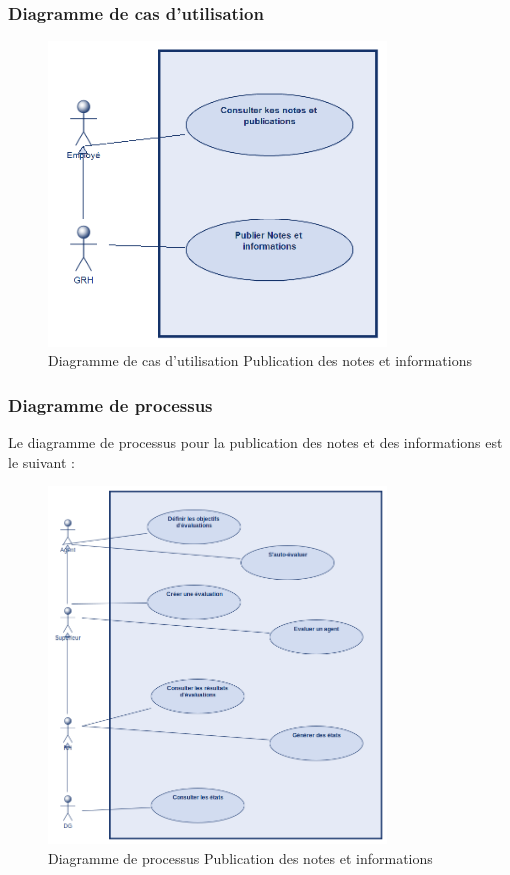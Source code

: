 \subsubsection{Diagramme de cas d'utilisation}
\begin{figure}[H]
    \centering
    \includegraphics[width=0.8\textwidth]{images/diagrammes/use-cases/note.png}
    \caption{Diagramme de cas d'utilisation Publication des notes et informations}
    \label{fig:use_case_publication}
\end{figure}
\subsubsection{Diagramme de processus}
Le diagramme de processus pour la publication des notes et des informations est le suivant :
\begin{figure}[H]
    \centering
    \includegraphics[width=0.8\textwidth]{images/diagrammes/flowcharts/note.png}
    \caption{Diagramme de processus Publication des notes et informations}
    \label{fig:flow_publication}
\end{figure}

